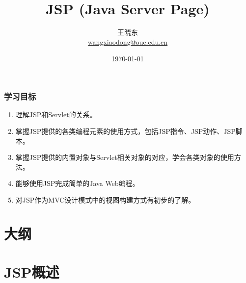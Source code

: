 
\title[KevinW@OUC]{\\  
JSP (Java Server Page)}
\author[王晓东]{王晓东\\
  \href{mailto:wangxiaodong@ouc.edu.cn}{\footnotesize wangxiaodong@ouc.edu.cn}}
\date{\today}


 \frame{\titlepage}

\begin{frame}
\frametitle{学习目标}
\begin{enumerate}
\item 理解JSP和Servlet的关系。
\item 掌握JSP提供的各类编程元素的使用方式，包括JSP指令、JSP动作、JSP脚本。
\item 掌握JSP提供的内置对象与Servlet相关对象的对应，学会各类对象的使用方法。
\item 能够使用JSP完成简单的Java Web编程。
\item 对JSP作为MVC设计模式中的视图构建方式有初步的了解。
\end{enumerate}  
\end{frame}


\section*{大纲}

\section{JSP概述}

